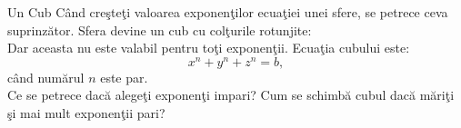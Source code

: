 \begin{surferPage}[Cubul]{Un Cub}
C\^and cre\c ste\c ti valoarea exponen\c tilor ecua\c tiei unei sfere, se petrece ceva suprinz\u ator. Sfera devine un cub cu col\c turile rotunjite:\\
\vspace{0.3cm}
Dar aceasta nu este valabil pentru to\c ti exponen\c tii. Ecua\c tia cubului este:
\[x^n+y^n+z^n=b,\]
c\^and num\u arul $n$ este par.\\
\vspace{0.3cm}
Ce se petrece dac\u a alege\c ti exponen\c ti impari? Cum se schimb\u a cubul dac\u a m\u ari\c ti \c si mai mult exponen\c tii pari?
\end{surferPage}